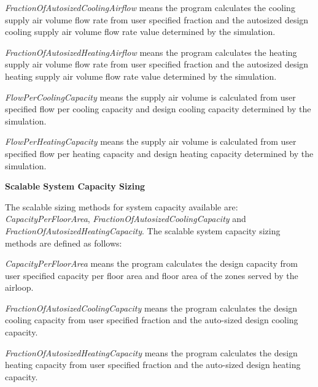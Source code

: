 \emph{FractionOfAutosizedCoolingAirflow} means the program calculates the cooling supply air volume flow rate from user specified fraction and the autosized design cooling supply air volume flow rate value determined by the simulation.

\emph{FractionOfAutosizedHeatingAirflow} means the program calculates the heating supply air volume flow rate from user specified fraction and the autosized design heating supply air volume flow rate value determined by the simulation.

\emph{FlowPerCoolingCapacity} means the supply air volume is calculated from user specified flow per cooling capacity and design cooling capacity determined by the simulation.

\emph{FlowPerHeatingCapacity} means the supply air volume is calculated from user specified flow per heating capacity and design heating capacity determined by the simulation.

\textbf{Scalable System Capacity Sizing}

The scalable sizing methods for system capacity available are: \emph{CapacityPerFloorArea}, \emph{FractionOfAutosizedCoolingCapacity} and \emph{FractionOfAutosizedHeatingCapacity}. The scalable system capacity sizing methods are defined as follows:

\emph{CapacityPerFloorArea} means the program calculates the design capacity from user specified capacity per floor area and floor area of the zones served by the airloop.

\emph{FractionOfAutosizedCoolingCapacity} means the program calculates the design cooling capacity from user specified fraction and the auto-sized design cooling capacity.

\emph{FractionOfAutosizedHeatingCapacity} means the program calculates the design heating capacity from user specified fraction and the auto-sized design heating capacity.
